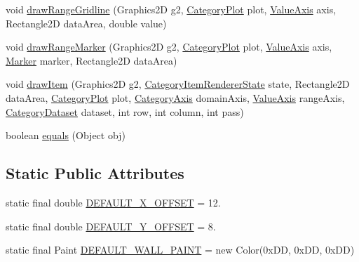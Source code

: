 \begin{DoxyCompactItemize}
\item 
void \mbox{\hyperlink{classorg_1_1jfree_1_1chart_1_1renderer_1_1category_1_1_line_renderer3_d_a75172b3218b41b1b59b104a69a2c7736}{draw\+Range\+Gridline}} (Graphics2D g2, \mbox{\hyperlink{classorg_1_1jfree_1_1chart_1_1plot_1_1_category_plot}{Category\+Plot}} plot, \mbox{\hyperlink{classorg_1_1jfree_1_1chart_1_1axis_1_1_value_axis}{Value\+Axis}} axis, Rectangle2D data\+Area, double value)
\item 
void \mbox{\hyperlink{classorg_1_1jfree_1_1chart_1_1renderer_1_1category_1_1_line_renderer3_d_a6efb01d1c10b7f130c5e7514c3ee72b6}{draw\+Range\+Marker}} (Graphics2D g2, \mbox{\hyperlink{classorg_1_1jfree_1_1chart_1_1plot_1_1_category_plot}{Category\+Plot}} plot, \mbox{\hyperlink{classorg_1_1jfree_1_1chart_1_1axis_1_1_value_axis}{Value\+Axis}} axis, \mbox{\hyperlink{classorg_1_1jfree_1_1chart_1_1plot_1_1_marker}{Marker}} marker, Rectangle2D data\+Area)
\item 
void \mbox{\hyperlink{classorg_1_1jfree_1_1chart_1_1renderer_1_1category_1_1_line_renderer3_d_af1376dbb4fdf4c38bc666d47ab38b4b6}{draw\+Item}} (Graphics2D g2, \mbox{\hyperlink{classorg_1_1jfree_1_1chart_1_1renderer_1_1category_1_1_category_item_renderer_state}{Category\+Item\+Renderer\+State}} state, Rectangle2D data\+Area, \mbox{\hyperlink{classorg_1_1jfree_1_1chart_1_1plot_1_1_category_plot}{Category\+Plot}} plot, \mbox{\hyperlink{classorg_1_1jfree_1_1chart_1_1axis_1_1_category_axis}{Category\+Axis}} domain\+Axis, \mbox{\hyperlink{classorg_1_1jfree_1_1chart_1_1axis_1_1_value_axis}{Value\+Axis}} range\+Axis, \mbox{\hyperlink{interfaceorg_1_1jfree_1_1data_1_1category_1_1_category_dataset}{Category\+Dataset}} dataset, int row, int column, int pass)
\item 
boolean \mbox{\hyperlink{classorg_1_1jfree_1_1chart_1_1renderer_1_1category_1_1_line_renderer3_d_a8b15ede2ead8cf9d2f78ddb9dda4a34e}{equals}} (Object obj)
\end{DoxyCompactItemize}
\subsection*{Static Public Attributes}
\begin{DoxyCompactItemize}
\item 
static final double \mbox{\hyperlink{classorg_1_1jfree_1_1chart_1_1renderer_1_1category_1_1_line_renderer3_d_a5a168c9c5743a98cba186b7dadc9fa08}{D\+E\+F\+A\+U\+L\+T\+\_\+\+X\+\_\+\+O\+F\+F\+S\+ET}} = 12.
\item 
static final double \mbox{\hyperlink{classorg_1_1jfree_1_1chart_1_1renderer_1_1category_1_1_line_renderer3_d_aee3d354a629c270a3b4458c3e97cfe2b}{D\+E\+F\+A\+U\+L\+T\+\_\+\+Y\+\_\+\+O\+F\+F\+S\+ET}} = 8.
\item 
static final Paint \mbox{\hyperlink{classorg_1_1jfree_1_1chart_1_1renderer_1_1category_1_1_line_renderer3_d_a0957fe0c53371a9c9f10d7ce4b69bd2a}{D\+E\+F\+A\+U\+L\+T\+\_\+\+W\+A\+L\+L\+\_\+\+P\+A\+I\+NT}} = new Color(0x\+D\+D, 0x\+D\+D, 0x\+D\+D)
\end{DoxyCompactItemize}
